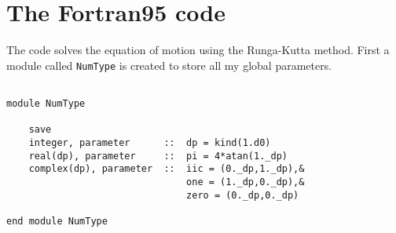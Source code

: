 \documentclass[12pt]{article}
\begin{document}
\section{The Fortran95 code}

The code solves the equation of motion using the Runga-Kutta method. First a module called {\tt NumType} is created to store all my global parameters.

\begin{lstlisting}[frame=single,caption={Module {\tt NumType}},label=module]

module NumType

	save
	integer, parameter		::	dp = kind(1.d0)
	real(dp), parameter		::	pi = 4*atan(1._dp)
	complex(dp), parameter	:: 	iic = (0._dp,1._dp),&
								one = (1._dp,0._dp),&
								zero = (0._dp,0._dp)

end module NumType
\end{lstlisting}
\end{document}
